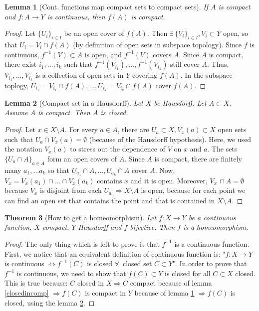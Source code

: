 \documentclass[a4paper,11pt,titlepage, article, oneside]{memoir}
\numberwithin{equation}{section}
\newtheorem{theorem}{Theorem}[section]
\newtheorem{lemma}[theorem]{Lemma}
\theoremstyle{definition}
\theoremstyle{remark}
\begin{document}
\begin{lemma} [Cont. functions map compact sets to compact sets] \label{contcomp}
If $A$ is compact and $f \colon A \rightarrow Y$ is continuous, then $f(A)$ is compact.
\end{lemma}
\begin{proof}
Let $\{U_i\}_{i \in I}$ be an open cover of $f(A)$. Then $\exists\,  \{V_i\}_{i \in I}, V_i \subset Y$ open, so that $U_i = V_i \cap f(A)$ (by definition of open sets in subspace topology). Since $f$ is continuous, $f^{-1}(V) \subset A$ is open, and $f^{-1}(V)$ covers $A$. Since $A$ is compact, there exist $i_1, \ldots, i_k$ such that $f^{-1}(V_{i_1}), \ldots, f^{-1}(V_{i_k})$ still cover $A$. Thus, $V_{i_1},\ldots, V_{i_k}$ is a collection of open sets in $Y$ covering $f(A)$. In the subspace toplogy, $U_{i_1} = V_{i_1} \cap f(A), \ldots, U_{i_k} = V_{i_k} \cap f(A)$ cover $f(A)$.
\end{proof}

\begin{lemma}[Compact set in a Hausdorff] \label{compinhauss}
Let $X$ be Hausdorff. Let $A \subset X$. Assume $A$ is compact. Then $A$ is closed.
\end{lemma}
\begin{proof}
Let $x \in X \setminus A$. For every $a \in A$, there are $U_a \subset X, V_x(a) \subset X$ open sets such that $U_a \cap V_x(a) = \emptyset$ (because of the Hausdorff hypothesis). Here, we used the notation $V_x(a)$ to stress out the dependence of $V$ on $x$ and $a$. The sets $\{U_a \cap A\}_{a \in A}$ form an open covers of $A$. Since $A$ is compact, there are finitely many $a_1, \ldots a_k$ so that $U_{a_1} \cap A, \ldots, U_{a_k} \cap A$ cover $A$. Now, $V_x = V_x(a_1) \cap \ldots \cap V_x(a_k)$ contains $x$ and it is open. Moreover, $V_x \,\cap A = \emptyset$ because $V_x$ is disjoint from each $U_{a_i} \Rightarrow X \setminus A$ is open, because for each point we can find an open set that contains the point and that is contained in $X \setminus A$.
\end{proof}

\begin{theorem} [How to get a homeomorphism]
Let $f \colon X \rightarrow Y$ be a continuous function, $X$ compact, $Y$ Hausdorff and $f$ bijective. Then $f$ is a homeomorphism.
\end{theorem}
\begin{proof}
The only thing which is left to prove is that $f^{-1}$ is a continuous function. First, we notice that an equivalent definition of continuous function is: "$f \colon X \rightarrow Y$ is continuous $\Leftrightarrow f^{-1}(C)$ is closed $\forall \, $ closed set $C \subset Y$". In order to prove that $f^{-1}$ is continuous, we need to show that $f(C) \subset Y$ is closed for all $C \subset X$ closed. This is true because: $C$ closed in $X \Rightarrow C$ compact because of lemma \ref{closedincomp} $\Rightarrow f(C)$ is compact in $Y$ because of lemma \ref{contcomp} $\Rightarrow f(C)$ is closed, using the lemma \ref{compinhauss}.
\end{proof}
\end{document}
